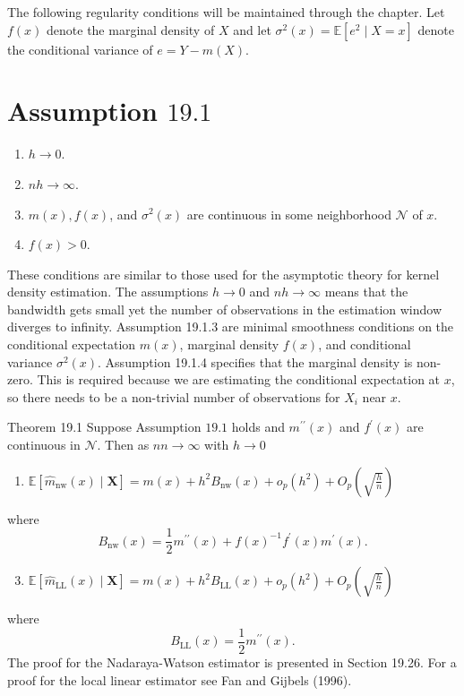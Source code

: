 \documentclass[10pt]{article}
\begin{document}
The following regularity conditions will be maintained through the chapter. Let $f(x)$ denote the marginal density of $X$ and let $\sigma^{2}(x)=\mathbb{E}\left[e^{2} \mid X=x\right]$ denote the conditional variance of $e=Y-m(X)$.

\section{Assumption $19.1$}
\begin{enumerate}
  \item $h \rightarrow 0$.

  \item $n h \rightarrow \infty$.

  \item $m(x), f(x)$, and $\sigma^{2}(x)$ are continuous in some neighborhood $\mathscr{N}$ of $x$.

  \item $f(x)>0$.

\end{enumerate}
These conditions are similar to those used for the asymptotic theory for kernel density estimation. The assumptions $h \rightarrow 0$ and $n h \rightarrow \infty$ means that the bandwidth gets small yet the number of observations in the estimation window diverges to infinity. Assumption 19.1.3 are minimal smoothness conditions on the conditional expectation $m(x)$, marginal density $f(x)$, and conditional variance $\sigma^{2}(x)$. Assumption 19.1.4 specifies that the marginal density is non-zero. This is required because we are estimating the conditional expectation at $x$, so there needs to be a non-trivial number of observations for $X_{i}$ near $x$.

Theorem 19.1 Suppose Assumption $19.1$ holds and $m^{\prime \prime}(x)$ and $f^{\prime}(x)$ are continuous in $\mathscr{N}$. Then as $n n \rightarrow \infty$ with $h \rightarrow 0$

\begin{enumerate}
  \item $\mathbb{E}\left[\widehat{m}_{\mathrm{nw}}(x) \mid \boldsymbol{X}\right]=m(x)+h^{2} B_{\mathrm{nw}}(x)+o_{p}\left(h^{2}\right)+O_{p}\left(\sqrt{\frac{h}{n}}\right)$
\end{enumerate}
where
$$
B_{\mathrm{nw}}(x)=\frac{1}{2} m^{\prime \prime}(x)+f(x)^{-1} f^{\prime}(x) m^{\prime}(x) .
$$

\begin{enumerate}
  \setcounter{enumi}{2}
  \item $\mathbb{E}\left[\widehat{m}_{\mathrm{LL}}(x) \mid \boldsymbol{X}\right]=m(x)+h^{2} B_{\mathrm{LL}}(x)+o_{p}\left(h^{2}\right)+O_{p}\left(\sqrt{\frac{h}{n}}\right)$
\end{enumerate}
where
$$
B_{\mathrm{LL}}(x)=\frac{1}{2} m^{\prime \prime}(x) .
$$
The proof for the Nadaraya-Watson estimator is presented in Section 19.26. For a proof for the local linear estimator see Fan and Gijbels (1996).
\end{document}
